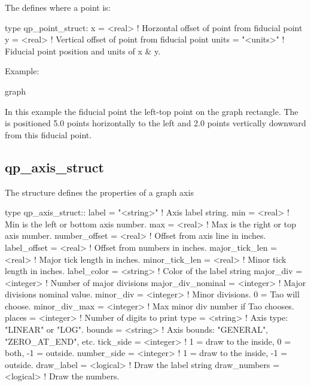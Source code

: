 The  defines where a point is:
\begin{example}
  type qp_point_struct:
    x     = <real>     ! Horzontal offset of point from fiducial point
    y     = <real>     ! Vertical offset of point from fiducial point
    units = "<units>"  ! Fiducial point position and units of x \& y.
\end{example}
Example:
\begin{example}
  graph%
\end{example}
In this example the fiducial point the left-top point on the graph rectangle. The
 is positioned 5.0 points horizontally to the left and 2.0 points vertically
downward from this fiducial point.

\subsection{qp\_axis\_struct}
\label{s:qp.axis}

The  structure defines the properties of a graph axis
\begin{example}
  type qp_axis_struct::
    label             = "<string>" ! Axis label string.
    min               = <real>     ! Min is the left or bottom axis number.
    max               = <real>     ! Max is the right or top axis number.
    number_offset     = <real>     ! Offset from axis line in inches.
    label_offset      = <real>     ! Offset from numbers in inches.
    major_tick_len    = <real>     ! Major tick length in inches.
    minor_tick_len    = <real>     ! Minor tick length in inches.
    label_color       = <string>   ! Color of the label string
    major_div         = <integer>  ! Number of major divisions
    major_div_nominal = <integer>  ! Major divisions nominal value.
    minor_div         = <integer>  ! Minor divisions. 0 = Tao will choose.
    minor_div_max     = <integer>  ! Max minor div number if Tao chooses.
    places            = <integer>  ! Number of digits to print
    type              = <string>   ! Axis type: "LINEAR" or "LOG".
    bounds            = <string>   ! Axis bounds: "GENERAL", "ZERO_AT_END", etc.
    tick_side         = <integer>  ! 1 = draw to the inside, 0 = both, -1 = outside.
    number_side       = <integer>  ! 1 = draw to the inside, -1 = outside.
    draw_label        = <logical>  ! Draw the label string
    draw_numbers      = <logical>  ! Draw the numbers.
\end{example}

